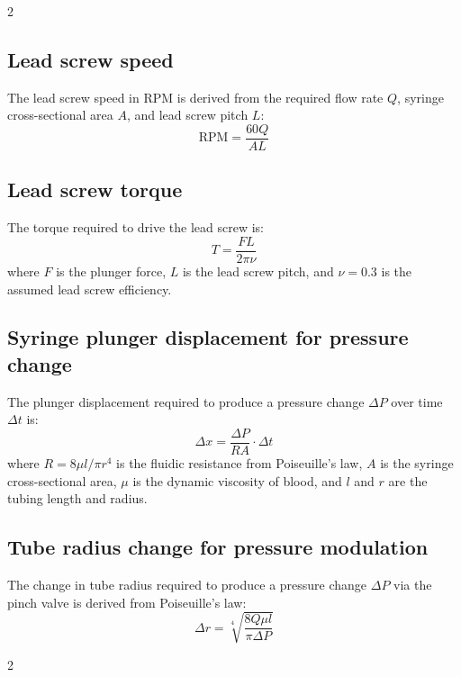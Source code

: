 \documentclass[10pt, a4paper]{article}
\begin{document}
\begin{multicols}{2}
    \subsection{Lead screw speed}

    The lead screw speed in RPM is derived from the required flow rate $Q$, syringe cross-sectional area $A$, and lead screw pitch $L$:
    \begin{equation}
        \text{RPM} = \frac{60Q}{AL}
    \end{equation}

    \subsection{Lead screw torque}

    The torque required to drive the lead screw is:
    \begin{equation}
        T = \frac{FL}{2\pi\nu}
    \end{equation}
    where $F$ is the plunger force, $L$ is the lead screw pitch, and $\nu = 0.3$ is the assumed lead screw efficiency.

    \subsection{Syringe plunger displacement for pressure change}

    The plunger displacement required to produce a pressure change $\Delta P$ over time $\Delta t$ is:
    \begin{equation}
        \Delta x = \frac{\Delta P}{RA} \cdot \Delta t
    \end{equation}
    where $R = 8\mu l / \pi r^4$ is the fluidic resistance from Poiseuille's law, $A$ is the syringe cross-sectional area, $\mu$ is the dynamic viscosity of blood, and $l$ and $r$ are the tubing length and radius.

    \subsection{Tube radius change for pressure modulation}

    The change in tube radius required to produce a pressure change $\Delta P$ via the pinch valve is derived from Poiseuille's law:
    \begin{equation}
        \Delta r = \sqrt[4]{\frac{8Q\mu l}{\pi \Delta P}}
    \end{equation}
\end{multicols}

\begingroup
\renewcommand{\bibfont}{\footnotesize}
\printbibheading
\begin{multicols}{2}
    \printbibliography[heading=none]
\end{multicols}
\endgroup
\end{document}
